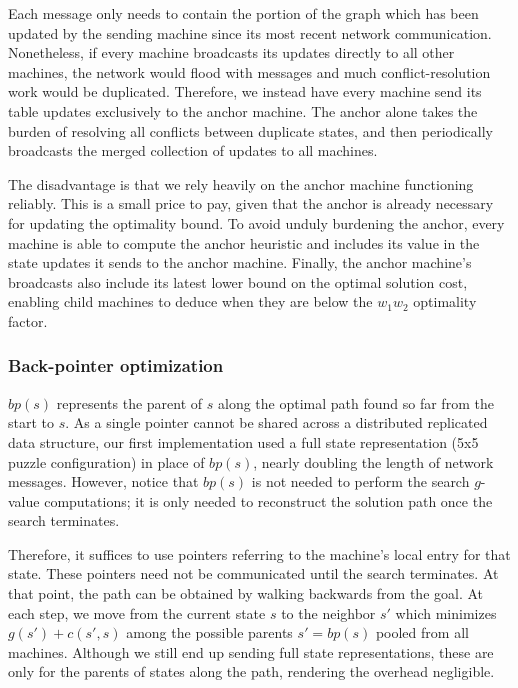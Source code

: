 \documentclass[11pt]{article}
\begin{document}
{Each message only needs to contain the portion of the graph which has been updated by the sending machine since its most recent network communication. Nonetheless, if every machine broadcasts its updates directly to all other machines, the network would flood with messages and much conflict-resolution work would be duplicated. Therefore, we instead have every machine send its table updates exclusively to the anchor machine. The anchor alone takes the burden of resolving all conflicts between duplicate states, and then periodically broadcasts the merged collection of updates to all machines.

The disadvantage is that we rely heavily on the anchor machine functioning reliably. This is a small price to pay, given that the anchor is already necessary for updating the optimality bound. To avoid unduly burdening the anchor, every machine is able to compute the anchor heuristic and includes its value in the state updates it sends to the anchor machine. Finally, the anchor machine's broadcasts also include its latest lower bound on the optimal solution cost, enabling child machines to deduce when they are below the $w_1w_2$ optimality factor.

\subsubsection*{Back-pointer optimization}

$bp(s)$ represents the parent of $s$ along the optimal path found so far from the start to $s$. As a single pointer cannot be shared across a distributed replicated data structure, our first implementation used a full state representation (5x5 puzzle configuration) in place of $bp(s)$, nearly doubling the length of network messages. However, notice that $bp(s)$ is not needed to perform the search $g$-value computations; it is only needed to reconstruct the solution path once the search terminates.

Therefore, it suffices to use pointers referring to the machine's local entry for that state. These pointers need not be communicated until the search terminates. At that point, the path can be obtained by walking backwards from the goal. At each step, we move from the current state $s$ to the neighbor $s'$ which minimizes $g(s') + c(s',s)$ among the possible parents $s'=bp(s)$ pooled from all machines. Although we still end up sending full state representations, these are only for the parents of states along the path, rendering the overhead negligible.

}
\end{document}
